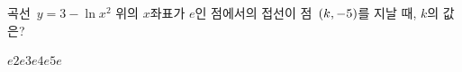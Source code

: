 곡선~$y=3-\ln x^2$ 위의 $x$좌표가 $e$인 점에서의 접선이 점~$(k{,}\mkern3mu\mathopen{}-5)$를 지날 때, $k$의 값은?
\begin{choices32}{$e$}{$2e$}{$3e$}{$4e$}{$5e$}\end{choices32}
